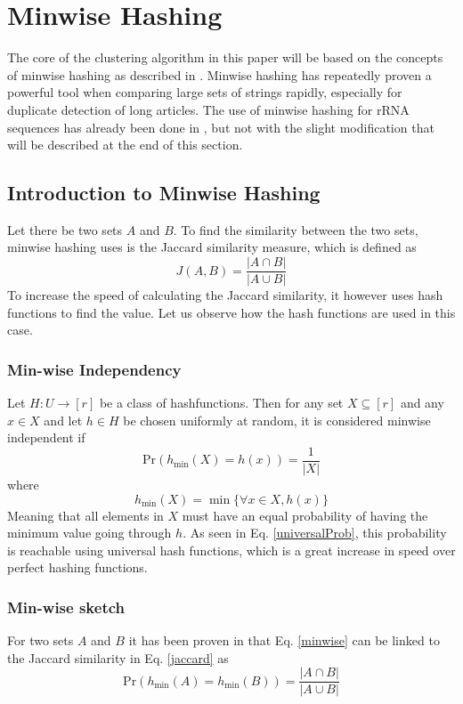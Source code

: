 \documentclass[../../main.tex]{subfiles}
\begin{document}
\section{Minwise Hashing}
The core of the clustering algorithm in this paper will be based on the concepts of minwise hashing as described in \cite{MinwiseIndependent}. Minwise hashing has repeatedly proven a powerful tool when comparing large sets of strings rapidly, especially for duplicate detection of long articles. The use of minwise hashing for rRNA sequences has already been done in \cite{MinhashMapreduce}, but not with the slight modification that will be described at the end of this section.

\subsection*{Introduction to Minwise Hashing}
Let there be two sets $A$ and $B$. To find the similarity between the two sets, minwise hashing uses is the Jaccard similarity measure, which is defined as
\begin{equation}\label{jaccard}
J(A,B)=\frac{|A\cap B|}{|A\cup B|}
\end{equation}
To increase the speed of calculating the Jaccard similarity, it however uses hash functions to find the value. Let us observe how the hash functions are used in this case.
\subsubsection*{Min-wise Independency}
Let $H: U \rightarrow [r]$ be a class of hashfunctions. Then for any set $X\subseteq [r]$ and any $x \in X$ and let $h\in H$ be chosen uniformly at random, it is considered minwise independent if
\begin{equation}\label{minwise}
\mathrm{Pr}(h_{\min}(X)=h(x))=\frac{1}{|X|}
\end{equation}
where
$$
h_{\min}(X) = \min\{\forall x \in X, h(x)\} 
$$
Meaning that all elements in $X$ must have an equal probability of having the minimum value going through $h$. As seen in Eq. \ref{universalProb}, this probability is reachable using universal hash functions, which is a great increase in speed over perfect hashing functions.

\subsubsection*{Min-wise sketch}
For two sets $A$ and $B$ it has been proven in \cite{protominwise} that Eq. \ref{minwise} can be linked to the Jaccard similarity in Eq. \ref{jaccard} as
\begin{equation}\label{minwisejaccard}
\mathrm{Pr}(h_{\min}(A)=h_{\min}(B))=\frac{|A\cap B|}{|A\cup B|}
\end{equation}
\end{document}
